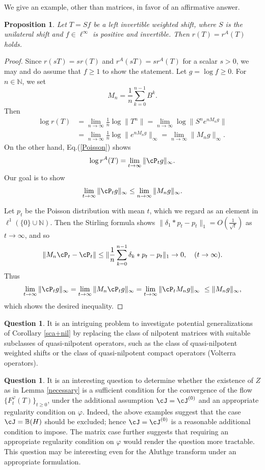 \documentclass[12pt]{article}
\newtheorem{proposition}[theorem]{Proposition}
\theoremstyle{definition}
\newtheorem{question}[theorem]{Question}
\numberwithin{equation}{section}
\newcommand{\B}{\mathbb{B}}
\newcommand{\N}{\mathbb{N}}
\begin{document}
We give an example, other than matrices, in favor of an affirmative answer. 

\begin{proposition} Let $T=Sf$ be a left invertible weighted shift, where $S$ is the unilateral shift and $f\in \ell^\infty$ 
is positive and invertible. 
Then  $r(T)=r^A(T)$ holds.  
\end{proposition}

\begin{proof} Since $r(sT)=sr(T)$ and $r^A(sT)=sr^A(T)$ for a scalar $s>0$, we may and do assume that $f\geq 1$ to show 
the statement.  
Let $g=\log f\geq 0$. 
For $n\in \N$, we set 
\[M_n=\frac{1}{n}\sum_{k=0}^{n-1}B^k.\]
Then
\begin{align*}
\log r(T) & =\lim_{n\to \infty}\frac{1}{n}\log \|T^n\|=\lim_{n\to \infty}\log \|S^ne^{nM_ng}\|\\
	 & =\lim_{n\to \infty}\frac{1}{n}\log \|e^{nM_ng}\|_\infty=\lim_{n\to\infty}\|M_ng\|_\infty. 
\end{align*}
On the other hand, Eq.(\ref{Poisson}) shows 
\[\log r^A(T)=\lim_{t\to\infty}\|\cP_tg\|_\infty.
\]
Our goal is to show 
\[\lim_{t\to\infty}\|\cP_tg\|_\infty\leq \lim_{n\to\infty}\|M_ng\|_\infty.\] 

Let $p_t$ be the Poisson distribution with mean $t$, which we regard as an element in $\ell^1(\{0\}\cup \N)$.  
Then the Stirling formula shows $\|\delta_1*p_t-p_t\|_1=O(\frac{1}{\sqrt{t}})$ as $t\to\infty$, and so 
\[\|M_n\cP_t-\cP_t\|\leq \|\frac{1}{n}\sum_{k=0}^{n-1}\delta_k*p_t-p_t\|_1\to 0,\quad (t\to\infty).\]
Thus 
\[\lim_{t\to\infty}\|\cP_t g\|_\infty=\lim_{t\to\infty}\|M_n\cP_t g\|_\infty=\lim_{t\to\infty}\|\cP_t M_ng\|_\infty\
\leq \|M_ng\|_\infty,\]
which shows the desired inequality. 
\end{proof}

\begin{question} It is an intriguing problem to investigate potential generalizations of Corollary \ref{sca+nil} by replacing 
the class of nilpotent matrices with suitable subclasses of quasi-nilpotent operators, such as 
the class of quasi-nilpotent weighted shifts or the class of quasi-nilpotent compact operators (Volterra operators).   
\end{question}

\begin{question}
It is an interesting question to determine whether the existence of $Z$ as in Lemma \ref{necessary} is a sufficient condition for the convergence of the flow $\{F^\varphi_t(T)\}_{t\geq 0}$, under the additional assumption $\cJ=\cJ^{(0)}$ and an appropriate regularity condition on $\varphi$. 
Indeed, the above examples suggest that the case $\cJ=\B(H)$ should be excluded; hence $\cJ=\cJ^{(0)}$ is a reasonable additional condition to impose. 
The matrix case further suggests that requiring an appropriate regularity condition on $\varphi$ would render the question more tractable. 
This question may be interesting even for the Aluthge transform under an appropriate formulation. 
\end{question}
\end{document}
